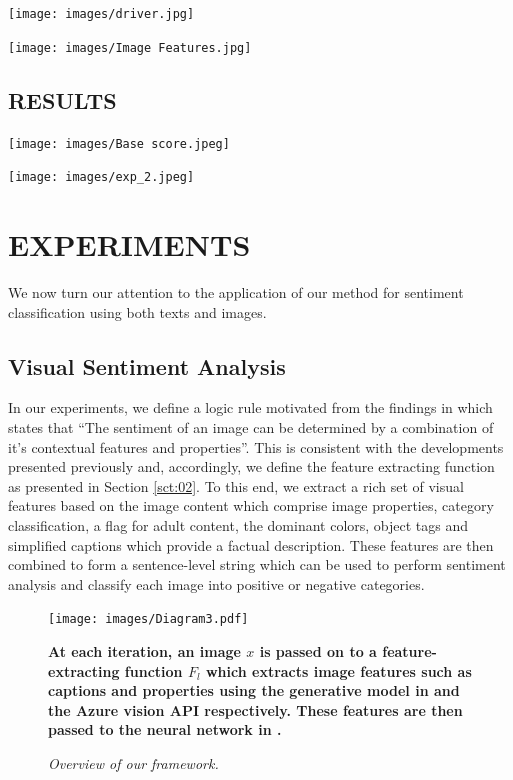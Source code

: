 \documentclass[12pt,a4paper]{article}
\begin{document}
\begin{center}
\texttt{[image: images/driver.jpg]}
\end{center}

\begin{center}
\texttt{[image: images/Image Features.jpg]}
\end{center}

\subsection{RESULTS}

\begin{center}
\texttt{[image: images/Base score.jpeg]}
\end{center}

\begin{center}
\texttt{[image: images/exp\_2.jpeg]}
\end{center}


\newpage
\section{\uppercase{experiments}}
We now turn our attention to the application of our method for sentiment classification using both texts and images. 

\subsection{Visual Sentiment Analysis}
In our experiments, we define a logic rule motivated from the findings in \cite{Truong:2017} which states that ``The sentiment of an image can be determined by a combination of it's contextual features and properties''. This is consistent with the developments presented previously and, accordingly, we define the feature extracting function as presented in Section \ref{sct:02}. To this end, we extract a rich set of visual features based on the image content which comprise image properties, category classification, a flag for adult content, the dominant colors, object tags and simplified captions which provide a factual description. These features are then combined to form a sentence-level string which can be used to perform sentiment analysis and classify each image into positive or negative categories.
\vspace{2mm}

\begin{figure}[!hb]
\vspace{2mm}
\begin{center}
\texttt{[image: images/Diagram3.pdf]}
\end{center}
\caption{\textit{Overview of our framework.}} \textbf{At each iteration, an image $x$ is passed on to a feature-extracting function $F_l$ which extracts image features such as captions %
and properties %
using the generative model in \cite{Vinyals:2016} and the Azure vision API respectively. These features are then passed to the neural network  %
  in \cite{Kim:2014}.}
\label{fig:05}
\end{figure}
\end{document}
